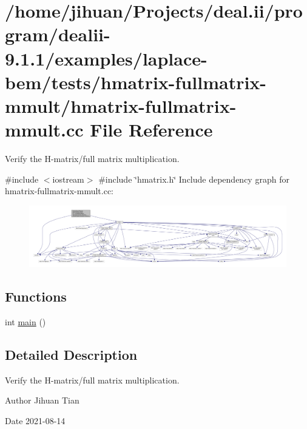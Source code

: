 \hypertarget{hmatrix-fullmatrix-mmult_8cc}{}\section{/home/jihuan/\+Projects/deal.ii/program/dealii-\/9.1.1/examples/laplace-\/bem/tests/hmatrix-\/fullmatrix-\/mmult/hmatrix-\/fullmatrix-\/mmult.cc File Reference}
\label{hmatrix-fullmatrix-mmult_8cc}


Verify the H-\/matrix/full matrix multiplication.  


{\ttfamily \#include $<$iostream$>$}\newline
{\ttfamily \#include \char`\"{}hmatrix.\+h\char`\"{}}\newline
Include dependency graph for hmatrix-\/fullmatrix-\/mmult.cc\+:
\nopagebreak
\begin{figure}[H]
\begin{center}
\leavevmode
\includegraphics[width=350pt]{hmatrix-fullmatrix-mmult_8cc__incl}
\end{center}
\end{figure}
\subsection*{Functions}
\begin{DoxyCompactItemize}
\item 
int \hyperlink{hmatrix-fullmatrix-mmult_8cc_ae66f6b31b5ad750f1fe042a706a4e3d4}{main} ()
\end{DoxyCompactItemize}


\subsection{Detailed Description}
Verify the H-\/matrix/full matrix multiplication. 

\begin{DoxyAuthor}{Author}
Jihuan Tian 
\end{DoxyAuthor}
\begin{DoxyDate}{Date}
2021-\/08-\/14 
\end{DoxyDate}



